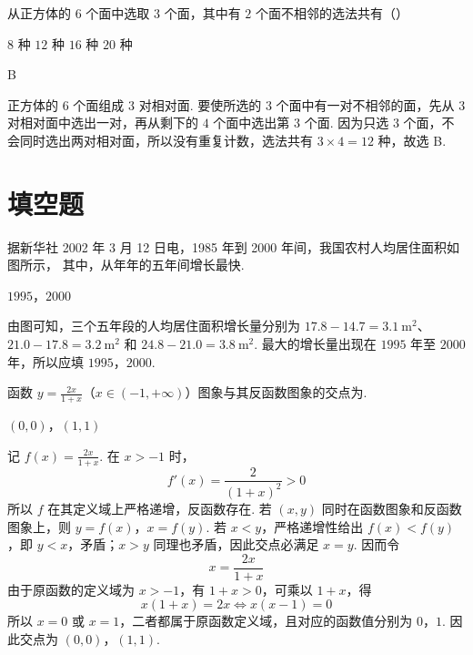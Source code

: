 \begin{problem}
从正方体的 \(6\) 个面中选取 \(3\) 个面，其中有 \(2\) 个面不相邻的选法共有（\quad）

\choices
    {\(8\) 种}
    {\(12\) 种}
    {\(16\) 种}
    {\(20\) 种}
\end{problem}

\begin{answer}
B
\end{answer}

\begin{solution}
正方体的 \(6\) 个面组成 \(3\) 对相对面. 要使所选的 \(3\) 个面中有一对不相邻的面，先从 \(3\) 对相对面中选出一对，再从剩下的 \(4\) 个面中选出第 \(3\) 个面. 因为只选 \(3\) 个面，不会同时选出两对相对面，所以没有重复计数，选法共有 \(3\times4=12\) 种，故选 B.
\end{solution}

\section{填空题}
\begin{problem}
据新华社 2002 年 3 月 12 日电，1985 年到 2000 年间，我国农村人均居住面积如图所示，
其中，从\fillinblank{}年\fillinblank{}年的五年间增长最快.

\end{problem}

\begin{answer}
\(1995\)，\(2000\)
\end{answer}

\begin{solution}
由图可知，三个五年段的人均居住面积增长量分别为 \(17.8-14.7=3.1\mathrm{~m^{2}}\)、\(21.0-17.8=3.2\mathrm{~m^{2}}\) 和 \(24.8-21.0=3.8\mathrm{~m^{2}}\). 最大的增长量出现在 \(1995\) 年至 \(2000\) 年，所以应填 \(1995\)，\(2000\).
\end{solution}

\begin{problem}
函数 \( y = \frac{2x}{1 + x} \)（\(x \in (-1, +\infty)\)）图象与其反函数图象的交点为\fillinblank{}.
\end{problem}

\begin{answer}
\((0,0)\)，\((1,1)\)
\end{answer}

\begin{solution}
记 \(f(x)=\frac{2x}{1+x}\). 在 \(x>-1\) 时，
\[
f'(x)=\frac{2}{(1+x)^{2}}>0
\]
所以 \(f\) 在其定义域上严格递增，反函数存在. 若 \((x,y)\) 同时在函数图象和反函数图象上，则 \(y=f(x)\)，\(x=f(y)\). 若 \(x<y\)，严格递增性给出 \(f(x)<f(y)\)，即 \(y<x\)，矛盾；\(x>y\) 同理也矛盾，因此交点必满足 \(x=y\). 因而令
\[
x=\frac{2x}{1+x}
\]
由于原函数的定义域为 \(x>-1\)，有 \(1+x>0\)，可乘以 \(1+x\)，得
\[
x(1+x)=2x\Longleftrightarrow x(x-1)=0
\]
所以 \(x=0\) 或 \(x=1\)，二者都属于原函数定义域，且对应的函数值分别为 \(0\)，\(1\). 因此交点为 \((0,0)\)，\((1,1)\).
\end{solution}


